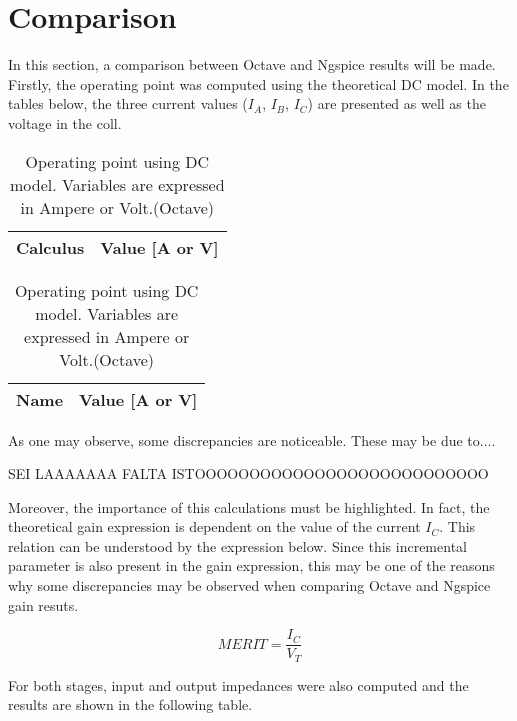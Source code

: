 \section{Comparison}
\label{section:comparison}

\par In this section, a comparison between Octave and Ngspice results will be made. Firstly, the operating point was computed using the theoretical DC model. In the tables below, the three current values ($I_{A}$, $I_{B}$, $I_{C}$) are presented as well as the voltage in the coll.

\begin{table}[ht]
\parbox{.45\linewidth}{
  \centering
  \begin{tabular}{|l|r|}
    \hline    
    {\bf Calculus} & {\bf Value [A or V]} \\ \hline
    
  \end{tabular}
  \caption{Operating point using DC model. Variables are expressed in Ampere or Volt. (Ngspice)}} 
\parbox{.45\linewidth}{
 \centering
  \begin{tabular}{|l|r|}
    \hline    
    {\bf Name} & {\bf Value [A or V]} \\ \hline
    
  \end{tabular}
  \caption{Operating point using DC model. Variables are expressed in Ampere or Volt.(Octave)}}
\end{table}

As one may observe, some discrepancies are noticeable. These may be due to....


SEI LAAAAAAA FALTA ISTOOOOOOOOOOOOOOOOOOOOOOOOOOO

Moreover, the importance of this calculations must be highlighted. In fact, the theoretical gain expression is dependent on the value of the current $I_{C}$. This relation can be understood by the expression below. Since this incremental parameter is also present in the gain expression, this may be one of the reasons why some discrepancies may be observed when comparing Octave and Ngspice gain resuts. 

\begin {equation}
	 MERIT = \frac{I_{C}}{V_{T}}  	
	\label{gm_eq}
\end{equation}

\par For both stages, input and output impedances were also computed and the results are shown in the following table.

